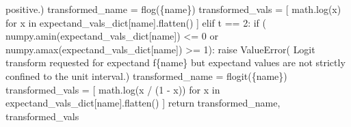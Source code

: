 \documentclass[
  letterpaper,
  DIV=11,
  numbers=noendperiod]{scrartcl}
\newenvironment{Shaded}{\begin{snugshade}}{\end{snugshade}}
\newcommand{\ControlFlowTok}[1]{\textcolor[rgb]{0.00,0.23,0.31}{#1}}
\newcommand{\DecValTok}[1]{\textcolor[rgb]{0.68,0.00,0.00}{#1}}
\newcommand{\KeywordTok}[1]{\textcolor[rgb]{0.00,0.23,0.31}{#1}}
\newcommand{\NormalTok}[1]{\textcolor[rgb]{0.00,0.23,0.31}{#1}}
\newcommand{\OperatorTok}[1]{\textcolor[rgb]{0.37,0.37,0.37}{#1}}
\newcommand{\PreprocessorTok}[1]{\textcolor[rgb]{0.68,0.00,0.00}{#1}}
\newcommand{\SpecialCharTok}[1]{\textcolor[rgb]{0.37,0.37,0.37}{#1}}
\newcommand{\SpecialStringTok}[1]{\textcolor[rgb]{0.13,0.47,0.30}{#1}}
\newcommand{\StringTok}[1]{\textcolor[rgb]{0.13,0.47,0.30}{#1}}
\begin{document}
\begin{Shaded}
\begin{Highlighting}[]
                        \StringTok{\textquotesingle{}positive.\textquotesingle{}}\NormalTok{)}
\NormalTok{    transformed\_name }\OperatorTok{=} \SpecialStringTok{f\textquotesingle{}log(}\SpecialCharTok{\{}\NormalTok{name}\SpecialCharTok{\}}\SpecialStringTok{)\textquotesingle{}}
\NormalTok{    transformed\_vals }\OperatorTok{=}\NormalTok{ [ math.log(x) }\ControlFlowTok{for}\NormalTok{ x }\KeywordTok{in}
\NormalTok{                         expectand\_vals\_dict[name].flatten() ]}
  \ControlFlowTok{elif}\NormalTok{ t }\OperatorTok{==} \DecValTok{2}\NormalTok{:}
    \ControlFlowTok{if}\NormalTok{ (   numpy.amin(expectand\_vals\_dict[name]) }\OperatorTok{\textless{}=} \DecValTok{0}
        \KeywordTok{or}\NormalTok{ numpy.amax(expectand\_vals\_dict[name]) }\OperatorTok{\textgreater{}=} \DecValTok{1}\NormalTok{):}
      \ControlFlowTok{raise} \PreprocessorTok{ValueError}\NormalTok{( }\StringTok{\textquotesingle{}Logit transform requested for expectand \textquotesingle{}}
                       \SpecialStringTok{f\textquotesingle{}}\SpecialCharTok{\{}\NormalTok{name}\SpecialCharTok{\}}\SpecialStringTok{ but expectand values are not strictly \textquotesingle{}}
                        \StringTok{\textquotesingle{}confined to the unit interval.\textquotesingle{}}\NormalTok{)}
\NormalTok{    transformed\_name }\OperatorTok{=} \SpecialStringTok{f\textquotesingle{}logit(}\SpecialCharTok{\{}\NormalTok{name}\SpecialCharTok{\}}\SpecialStringTok{)\textquotesingle{}}
\NormalTok{    transformed\_vals }\OperatorTok{=}\NormalTok{ [ math.log(x }\OperatorTok{/}\NormalTok{ (}\DecValTok{1} \OperatorTok{{-}}\NormalTok{ x)) }\ControlFlowTok{for}\NormalTok{ x }\KeywordTok{in}
\NormalTok{                         expectand\_vals\_dict[name].flatten() ]}
  \ControlFlowTok{return}\NormalTok{ transformed\_name, transformed\_vals}
\end{Highlighting}
\end{Shaded}
\end{document}
